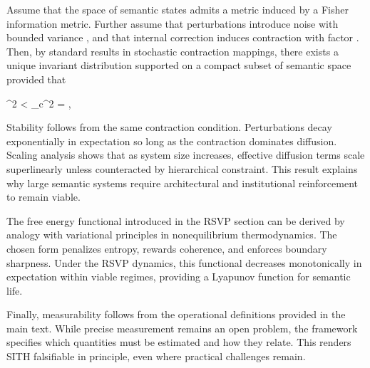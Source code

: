 \documentclass[11pt,oneside]{article}
\begin{document}
Assume that the space of semantic states admits a metric induced by a Fisher information metric. Further assume that perturbations introduce noise with bounded variance , and that internal correction induces contraction with factor . Then, by standard results in stochastic contraction mappings, there exists a unique invariant distribution supported on a compact subset of semantic space provided that

\sigma^2 < \sigma_c^2 = , 

Stability follows from the same contraction condition. Perturbations decay exponentially in expectation so long as the contraction dominates diffusion. Scaling analysis shows that as system size increases, effective diffusion terms scale superlinearly unless counteracted by hierarchical constraint. This result explains why large semantic systems require architectural and institutional reinforcement to remain viable.

The free energy functional introduced in the RSVP section can be derived by analogy with variational principles in nonequilibrium thermodynamics. The chosen form penalizes entropy, rewards coherence, and enforces boundary sharpness. Under the RSVP dynamics, this functional decreases monotonically in expectation within viable regimes, providing a Lyapunov function for semantic life.

Finally, measurability follows from the operational definitions provided in the main text. While precise measurement remains an open problem, the framework specifies which quantities must be estimated and how they relate. This renders SITH falsifiable in principle, even where practical challenges remain.
\end{document}
